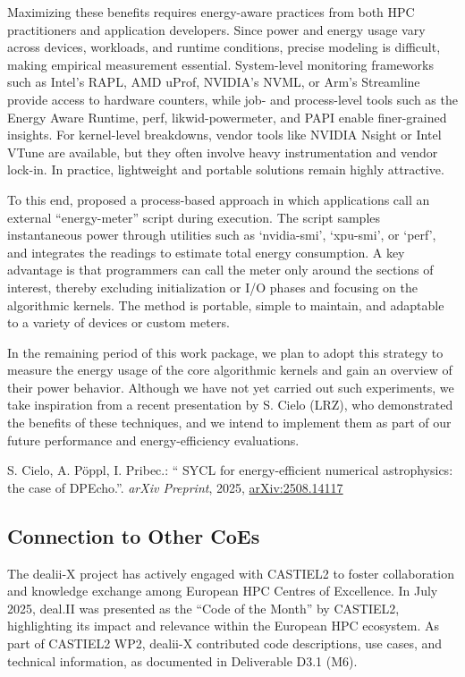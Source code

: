\documentclass[a4paper,12pt, numbers]{article}
\begin{document}
Maximizing these benefits requires energy-aware practices from both HPC practitioners and application developers. Since power and energy usage vary across devices, workloads, and runtime conditions, precise modeling is difficult, making empirical measurement essential. System-level monitoring frameworks such as Intel’s RAPL, AMD uProf, NVIDIA’s NVML, or Arm’s Streamline provide access to hardware counters, while job- and process-level tools such as the Energy Aware Runtime, perf, likwid-powermeter, and PAPI enable finer-grained insights. For kernel-level breakdowns, vendor tools like NVIDIA Nsight or Intel VTune are available, but they often involve heavy instrumentation and vendor lock-in. In practice, lightweight and portable solutions remain highly attractive.

To this end, \cite{Cielo25} proposed a process-based approach in which applications call an external ``energy-meter'' script during execution. The script samples instantaneous power through utilities such as `nvidia-smi', `xpu-smi', or `perf', and integrates the readings to estimate total energy consumption. A key advantage is that programmers can call the meter only around the sections of interest, thereby excluding initialization or I/O phases and focusing on the algorithmic kernels. The method is portable, simple to maintain, and adaptable to a variety of devices or custom meters. 

In the remaining period of this work package, we plan to adopt this strategy to measure the energy usage of the core algorithmic kernels and gain an overview of their power behavior. Although we have not yet carried out such experiments, we take inspiration from a recent presentation by S. Cielo (LRZ), who demonstrated the benefits of these techniques, and we intend to implement them as part of our future performance and energy-efficiency evaluations.

\begin{thebibliography}{10}
 S. Cielo, A. P\"oppl, I. Pribec.: `` {SYCL} for energy-efficient numerical astrophysics: the case of {DPE}cho.''. \emph{arXiv Preprint}, 2025, \href{https://doi.org/10.48550/arXiv.2508.14117}{arXiv:2508.14117}
\end{thebibliography}

\subsection{Connection to Other CoEs}

The dealii-X project has actively engaged with CASTIEL2 to foster collaboration and knowledge exchange among European HPC Centres of Excellence. In July 2025, deal.II was presented as the “Code of the Month” by CASTIEL2, highlighting its impact and relevance within the European HPC ecosystem. As part of CASTIEL2 WP2, dealii-X contributed code descriptions, use cases, and technical information, as documented in Deliverable D3.1 (M6).
\end{document}
